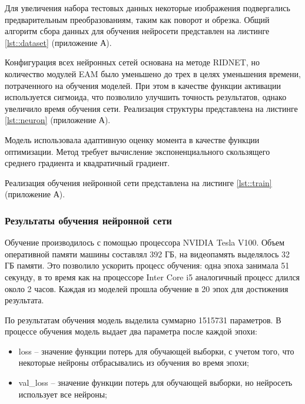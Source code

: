 Для увеличения набора тестовых данных некоторые изображения подвергались предварительным преобразованиям, таким как поворот и обрезка.
Общий алгоритм сбора данных для обучения нейросети представлен на листинге \ref{lst::dataset} (приложение А).

Конфигурация всех нейронных сетей основана на методе RIDNET, но количество модулей EAM было уменьшено до трех в целях уменьшения времени, потраченного на обучения моделей.
При этом в качестве функции активации используется сигмоида, что позволило улучшить точность результатов, однако увеличило время обучения сети.
Реализация структуры представлена на листинге \ref{lst::neuron} (приложение А).

Модель использовала адаптивную оценку момента в качестве функции оптимизации.
Метод требует вычисление экспоненциального скользящего среднего градиента и квадратичный градиент.

Реализация обучения нейронной сети представлена на листинге \ref{lst::train} (приложение А).

\subsubsection{Результаты обучения нейронной сети}
Обучение производилось с помощью процессора NVIDIA Tesla V100.
Объем оперативной памяти машины составлял 392 ГБ, на видеопамять выделялось 32 ГБ памяти.
Это позволило ускорить процесс обучения: одна эпоха занимала 51 секунду, в то время как на процессоре Inter Core i5 аналогичный процесс длился около 2 часов.
Каждая из моделей прошла обучение в 20 эпох для достижения результата.

По результатам обучения модель выделила суммарно 1515731 параметров. 
В процессе обучения модель выдает два параметра после каждой эпохи:
\begin{itemize}
	\item loss -- значение функции потерь для обучающей выборки, с учетом того, что некоторые нейроны отбрасывались из обучения во время эпохи;
	\item val\_loss -- значение функции потерь для обучающей выборки, но нейросеть использует все нейроны;
\end{itemize}

